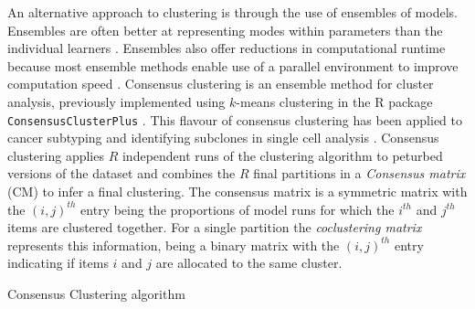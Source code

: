 \documentclass{bioinfo}
\begin{document}
An alternative approach to clustering is through the use of ensembles of models. Ensembles are often better at representing modes within parameters than the individual learners \citep{ghaemi2011review}. Ensembles also offer reductions in computational runtime because most ensemble methods enable use of a parallel environment to improve computation speed \citep{ghaemi2009survey}. Consensus clustering \citep{monti2003consensus} is an ensemble method for cluster analysis, previously implemented using $k$-means clustering in the R package \texttt{ConsensusClusterPlus} \citep{wilkerson2010consensusclusterplus}. This flavour of consensus clustering has been applied to cancer subtyping \citep{lehmann2011identification, verhaak2010integrated} and identifying subclones in single cell analysis \citep{kiselev2017sc3}. Consensus clustering applies $R$ independent runs of the clustering algorithm to peturbed versions of the dataset and combines the $R$ final partitions in a \emph{Consensus matrix} (CM) to infer a final clustering. The consensus matrix is a symmetric matrix with the $(i, j)^{th}$ entry being the proportions of model runs for which the $i^{th}$ and $j^{th}$ items are clustered together. For a single partition the \emph{coclustering matrix} represents this information, being a binary matrix with the $(i, j)^{th}$ entry indicating if items $i$ and $j$ are allocated to the same cluster.



\begin{algorithm} \label{algorithm:CC}
	\caption{Consensus Clustering algorithm}
\end{algorithm}
\end{document}

